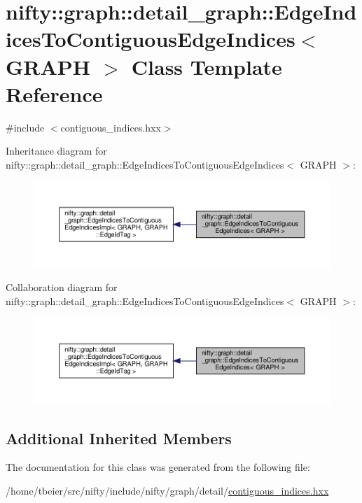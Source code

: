 \hypertarget{classnifty_1_1graph_1_1detail__graph_1_1EdgeIndicesToContiguousEdgeIndices}{}\section{nifty\+:\+:graph\+:\+:detail\+\_\+graph\+:\+:Edge\+Indices\+To\+Contiguous\+Edge\+Indices$<$ G\+R\+A\+PH $>$ Class Template Reference}
\label{classnifty_1_1graph_1_1detail__graph_1_1EdgeIndicesToContiguousEdgeIndices}


{\ttfamily \#include $<$contiguous\+\_\+indices.\+hxx$>$}



Inheritance diagram for nifty\+:\+:graph\+:\+:detail\+\_\+graph\+:\+:Edge\+Indices\+To\+Contiguous\+Edge\+Indices$<$ G\+R\+A\+PH $>$\+:
\nopagebreak
\begin{figure}[H]
\begin{center}
\leavevmode
\includegraphics[width=350pt]{classnifty_1_1graph_1_1detail__graph_1_1EdgeIndicesToContiguousEdgeIndices__inherit__graph}
\end{center}
\end{figure}


Collaboration diagram for nifty\+:\+:graph\+:\+:detail\+\_\+graph\+:\+:Edge\+Indices\+To\+Contiguous\+Edge\+Indices$<$ G\+R\+A\+PH $>$\+:
\nopagebreak
\begin{figure}[H]
\begin{center}
\leavevmode
\includegraphics[width=350pt]{classnifty_1_1graph_1_1detail__graph_1_1EdgeIndicesToContiguousEdgeIndices__coll__graph}
\end{center}
\end{figure}
\subsection*{Additional Inherited Members}


The documentation for this class was generated from the following file\+:\begin{DoxyCompactItemize}
\item 
/home/tbeier/src/nifty/include/nifty/graph/detail/\hyperlink{contiguous__indices_8hxx}{contiguous\+\_\+indices.\+hxx}\end{DoxyCompactItemize}

